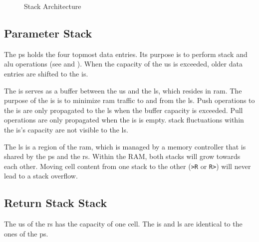 \begin{figure}[!h]
\begin{center}
{{
    }
  }
  \caption{Stack Architecture}
  \label{stacks:fig}
  \end{center}
\end{figure}

\subsection{Parameter Stack}
\label{stacks:ps}

The  \gls{ps} holds the four topmost data entries.
Its purpose is to perform stack and \gls{alu} operations
(see  and ).
When the capacity of the \gls{us} is exceeded, older data entries are shifted
to the \gls{is}.

The \gls{is} serves as a buffer between the \gls{us} and the \gls{ls}, which resides
in \gls{ram}. The purpose of the \gls{is} is to minimize \gls{ram} traffic to and
from the \gls{ls}.
Push operations to the \gls{is} are only propagated to the \gls{ls} when the buffer
capacity is exceeded. Pull operations are only propagated when the \gls{is} is empty.
\Gls{stack} fluctuations within the \gls{is}'s capacity are not visible to the \gls{ls}.

The \gls{ls} is a region of the \gls{ram}, which is managed by a memory controller
that is shared by the \gls{ps} and the \gls{rs}. Within the RAM, both stacks will
grow towards each other. Moving cell content from one stack to the other (\texttt{>R} 
or \texttt{R>}) will never lead to a stack overflow. 

\subsection{Return Stack Stack}
\label{stacks:rs}

The \gls{us} of the \gls{rs} has the capacity of one \gls{cell}. The \gls{is} and
\gls{ls} are identical to the ones of the \gls{ps}.
